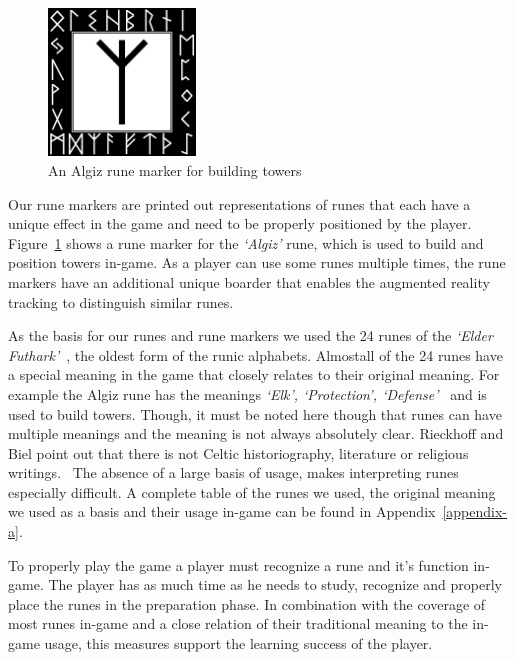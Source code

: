 \begin{figure}
	\centering
	\includegraphics[width=0.35\textwidth]{figures/algiz0.jpeg}
	\caption{\label{fig:rune-marker} An Algiz rune marker for building towers}
\end{figure}

Our rune markers are printed out representations of runes that each have a unique effect in the game and need to be properly positioned by the player. Figure~\ref{fig:rune-marker} shows a rune marker for the \textit{`Algiz'} rune, which is used to build and position towers in-game.
As a player can use some runes multiple times, the rune markers have an additional unique boarder that enables the augmented reality tracking to distinguish similar runes.

As the basis for our runes and rune markers we used the 24 runes of the \textit{`Elder Futhark'}~\cite{elder-futhark}, the oldest form of the runic alphabets.
Almost\footnotemark all of the 24 runes have a special meaning in the game that closely relates to their original meaning.
For example the Algiz rune has the meanings \textit{`Elk', `Protection', `Defense'}~\cite{algiz} and is used to build towers.
Though, it must be noted here though that runes can have multiple meanings and the meaning is not always absolutely clear.
Rieckhoff and Biel point out that there is not Celtic historiography, literature or religious writings.~\cite{rieckhoff-runes} The absence of a large basis of usage, makes interpreting runes especially difficult.
A complete table of the runes we used, the original meaning we used as a basis and their usage in-game can be found in Appendix~\ref{appendix-a}.

To properly play the game a player must recognize a rune and it's function in-game.
The player has as much time as he needs to study, recognize and properly place the runes in the preparation phase.\footnotemark
In combination with the coverage of most runes in-game and a close relation of their traditional meaning to the in-game usage, this measures support the learning success of the player.

